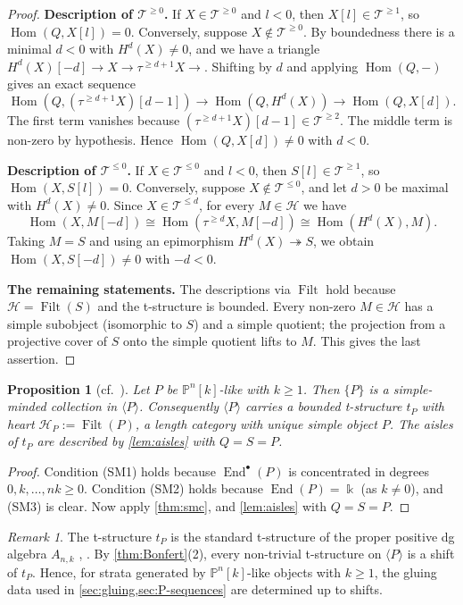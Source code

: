 \documentclass[11pt,reqno]{amsart}
\theoremstyle{plain}
\newtheorem{proposition}[theorem]{Proposition}
\theoremstyle{definition}
\theoremstyle{remark}
\newtheorem{remark}[theorem]{Remark}
\newcommand{\kk}{\Bbbk}
\DeclareMathOperator{\Hom}{Hom}
\DeclareMathOperator{\End}{End}
\DeclareMathOperator{\Filt}{Filt}
\newcommand{\thick}[1]{\langle #1\rangle}
\newcommand{\Pn}[2]{\mathbb{P}^{#1}[#2]}
\newcommand{\cH}{\mathcal{H}}
\newcommand{\cT}{\mathcal{T}}
\begin{document}
\begin{proof}
\textbf{Description of $\cT^{\ge0}$.} If $X\in\cT^{\ge0}$ and $l<0$, then $X[l]\in\cT^{\ge1}$, so $\Hom(Q,X[l])=0$. Conversely, suppose $X\notin\cT^{\ge0}$. By boundedness there is a minimal $d<0$ with $H^d(X)\ne0$, and we have a triangle $H^d(X)[-d]\to X\to\tau^{\ge d+1}X\to$. Shifting by $d$ and applying $\Hom(Q,-)$ gives an exact sequence
\[\Hom(Q,(\tau^{\ge d+1}X)[d-1])\to\Hom(Q,H^d(X))\to\Hom(Q,X[d]).\]
The first term vanishes because $(\tau^{\ge d+1}X)[d-1]\in\cT^{\ge2}$. The middle term is non-zero by hypothesis. Hence $\Hom(Q,X[d])\ne0$ with $d<0$.

\textbf{Description of $\cT^{\le0}$.} If $X\in\cT^{\le0}$ and $l<0$, then $S[l]\in\cT^{\ge1}$, so $\Hom(X,S[l])=0$. Conversely, suppose $X\notin\cT^{\le0}$, and let $d>0$ be maximal with $H^d(X)\ne0$. Since $X\in\cT^{\le d}$, for every $M\in\cH$ we have
\[\Hom(X,M[-d])\cong\Hom(\tau^{\ge d}X,M[-d])\cong\Hom(H^d(X),M).\]
Taking $M=S$ and using an epimorphism $H^d(X)\twoheadrightarrow S$, we obtain $\Hom(X,S[-d])\ne0$ with $-d<0$.

\textbf{The remaining statements.} The descriptions via $\Filt$ hold because $\cH=\Filt(S)$ and the t-structure is bounded. Every non-zero $M\in\cH$ has a simple subobject (isomorphic to $S$) and a simple quotient; the projection from a projective cover of $S$ onto the simple quotient lifts to $M$. This gives the last assertion.
\end{proof}

\begin{proposition}[{cf.\ \cite[\S3.2]{Bonf26}}]\label{prop:tP}
Let $P$ be $\Pn nk$-like with $k\ge1$. Then $\{P\}$ is a simple-minded collection in $\thick P$. Consequently $\thick P$ carries a bounded t-structure $t_P$ with heart $\cH_P:=\Filt(P)$, a length category with unique simple object $P$. The aisles of $t_P$ are described by \cref{lem:aisles} with $Q=S=P$.
\end{proposition}

\begin{proof}
Condition (SM1) holds because $\End^\bullet(P)$ is concentrated in degrees $0,k,\dots,nk\ge0$. Condition (SM2) holds because $\End(P)=\kk$ (as $k\ne0$), and (SM3) is clear. Now apply \cref{thm:smc}, and \cref{lem:aisles} with $Q=S=P$.
\end{proof}

\begin{remark}\label{rem:tP-unique}
The t-structure $t_P$ is the standard t-structure of the proper positive dg algebra $A_{n,k}$ \cite[Thm.~7.1]{KN13}, \cite[\S3.2]{Bonf26}. By \cref{thm:Bonfert}(2), every non-trivial t-structure on $\thick P$ is a shift of $t_P$. Hence, for strata generated by $\Pn nk$-like objects with $k\ge1$, the gluing data used in \cref{sec:gluing,sec:P-sequences} are determined up to shifts.
\end{remark}
\end{document}
